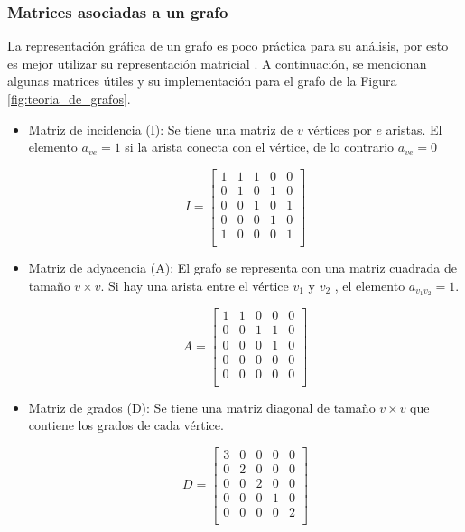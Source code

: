 \subsubsection{Matrices asociadas a un grafo}
La representación gráfica de un grafo es poco práctica para su análisis, por esto es mejor utilizar su representación matricial \cite{FrancoF_2016_trabajo_fin_de_grado}. A continuación, se mencionan algunas matrices útiles y su implementación para el grafo de la Figura \ref{fig:teoria_de_grafos}.


\begin{itemize}
	\item Matriz de incidencia (I): Se tiene una matriz de $v$ vértices por $e$ aristas. El elemento $a_{ve} = 1 $ si la arista conecta con el vértice, de lo contrario $a_{ve} = 0$
	
	\[
	I = 
	\left[\begin{array}{ccccc}
		1 & 1 & 1 & 0 & 0 \\
		0 & 1 & 0 & 1 & 0 \\
		0 & 0 & 1 & 0 & 1 \\
		0 & 0 & 0 & 1 & 0 \\
		1 & 0 & 0 & 0 & 1 \\
	\end{array} \right]
	\]

	\item Matriz de adyacencia (A): El grafo se representa con una matriz cuadrada de tamaño $v \times v$. Si hay una arista entre el vértice $v_1$ y $v_2$ , el elemento $a_{v_1 v_2} = 1$.
	
	\[
	A = 
	\left[\begin{array}{ccccc}
		1 & 1 & 0 & 0 & 0 \\
		0 & 0 & 1 & 1 & 0 \\
		0 & 0 & 0 & 1 & 0 \\
		0 & 0 & 0 & 0 & 0 \\
		0 & 0 & 0 & 0 & 0 \\
	\end{array} \right]
	\]
	
	\item Matriz de grados (D): Se tiene una matriz diagonal de tamaño $v \times v$ que contiene los grados de cada vértice. 
	
	\[
	D = 
	\left[\begin{array}{ccccc}
		3 & 0 & 0 & 0 & 0 \\
		0 & 2 & 0 & 0 & 0 \\
		0 & 0 & 2 & 0 & 0 \\
		0 & 0 & 0 & 1 & 0 \\
		0 & 0 & 0 & 0 & 2 \\
	\end{array} \right]
	\]
	

\end{itemize}
